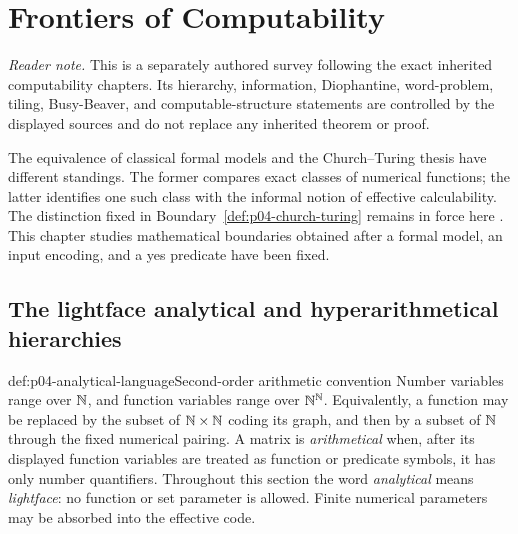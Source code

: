 
\chapter{Frontiers of Computability}
\label{sec:p04-frontiers-computability}

\noindent\textit{Reader note.} This is a separately authored survey following
the exact inherited computability chapters.  Its hierarchy, information,
Diophantine, word-problem, tiling, Busy-Beaver, and computable-structure
statements are controlled by the displayed sources and do not replace any
inherited theorem or proof.

The equivalence of classical formal models and the Church--Turing thesis have
different standings.  The former compares exact classes of numerical
functions; the latter identifies one such class with the informal notion of
effective calculability.  The distinction fixed in
Boundary~\ref{def:p04-church-turing} remains in force here
\cite{Turing1937Lambda,Soare1996ComputabilityRecursion}.  This chapter studies
mathematical boundaries obtained after a formal model, an input encoding, and
a yes predicate have been fixed.

\section{The lightface analytical and hyperarithmetical hierarchies}
\label{sec:p04-analytical-hierarchy}

\begin{hbconvention}{def:p04-analytical-language}{Second-order arithmetic convention}
Number variables range over \(\mathbb{N}\), and function variables range over
\(\mathbb{N}^{\mathbb{N}}\).  Equivalently, a function may be replaced by the subset of
\(\mathbb{N}\times\mathbb{N}\) coding its graph, and then by a subset of \(\mathbb{N}\) through the
fixed numerical pairing.  A matrix is \emph{arithmetical} when, after its displayed
function variables are treated as function or predicate symbols, it has only
number quantifiers.  Throughout this section the word \emph{analytical} means
\emph{lightface}: no function or set parameter is allowed.  Finite numerical
parameters may be absorbed into the effective code.
\end{hbconvention}

